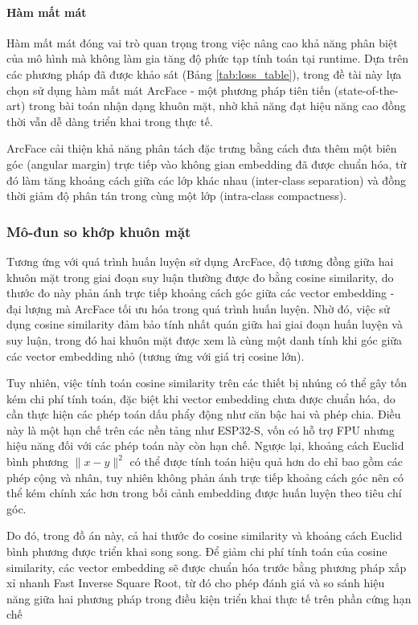 \paragraph{Hàm mất mát}

Hàm mất mát đóng vai trò quan trọng trong việc nâng cao khả năng phân biệt của mô hình mà không làm gia tăng độ phức tạp tính toán tại runtime. Dựa trên các phương pháp đã được khảo sát (Bảng \ref{tab:loss_table}), trong đề tài này lựa chọn sử dụng hàm mất mát ArcFace - một phương pháp tiên tiến (state-of-the-art) trong bài toán nhận dạng khuôn mặt, nhờ khả năng đạt hiệu năng cao đồng thời vẫn dễ dàng triển khai trong thực tế.

ArcFace cải thiện khả năng phân tách đặc trưng bằng cách đưa thêm một biên góc (angular margin) trực tiếp vào không gian embedding đã được chuẩn hóa, từ đó làm tăng khoảng cách giữa các lớp khác nhau (inter-class separation) và đồng thời giảm độ phân tán trong cùng một lớp (intra-class compactness).

\subsubsection{Mô-đun so khớp khuôn mặt}

Tương ứng với quá trình huấn luyện sử dụng ArcFace, độ tương đồng giữa hai khuôn mặt trong giai đoạn suy luận thường được đo bằng cosine similarity, do thước đo này phản ánh trực tiếp khoảng cách góc giữa các vector embedding - đại lượng mà ArcFace tối ưu hóa trong quá trình huấn luyện. Nhờ đó, việc sử dụng cosine similarity đảm bảo tính nhất quán giữa hai giai đoạn huấn luyện và suy luận, trong đó hai khuôn mặt được xem là cùng một danh tính khi góc giữa các vector embedding nhỏ (tương ứng với giá trị cosine lớn).

Tuy nhiên, việc tính toán cosine similarity trên các thiết bị nhúng có thể gây tốn kém chi phí tính toán, đặc biệt khi vector embedding chưa được chuẩn hóa, do cần thực hiện các phép toán dấu phẩy động như căn bậc hai và phép chia. Điều này là một hạn chế trên các nền tảng như ESP32-S, vốn có hỗ trợ FPU nhưng hiệu năng đối với các phép toán này còn hạn chế. Ngược lại, khoảng cách Euclid bình phương $\lVert x - y \rVert^2$ có thể được tính toán hiệu quả hơn do chỉ bao gồm các phép cộng và nhân, tuy nhiên không phản ánh trực tiếp khoảng cách góc nên có thể kém chính xác hơn trong bối cảnh embedding được huấn luyện theo tiêu chí góc.

Do đó, trong đồ án này, cả hai thước đo cosine similarity và khoảng cách Euclid bình phương được triển khai song song. Để giảm chi phí tính toán của cosine similarity, các vector embedding sẽ được chuẩn hóa trước bằng phương pháp xấp xỉ nhanh Fast Inverse Square Root, từ đó cho phép đánh giá và so sánh hiệu năng giữa hai phương pháp trong điều kiện triển khai thực tế trên phần cứng hạn chế

